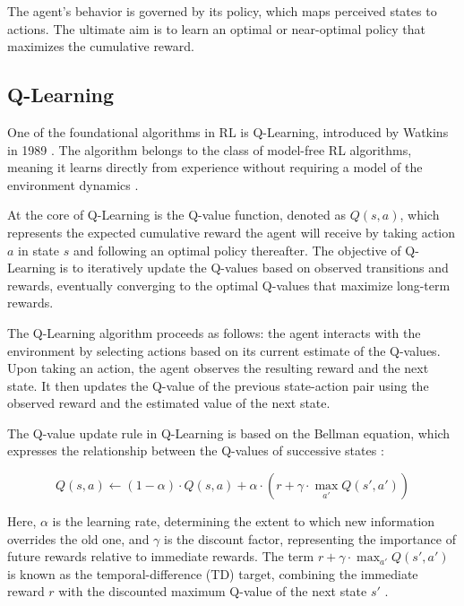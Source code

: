 The agent's behavior is governed by its policy, which maps perceived states to actions. The ultimate aim is to learn an optimal or near-optimal policy that maximizes the cumulative reward. 


\subsection{Q-Learning}

One of the foundational algorithms in RL is Q-Learning, introduced by Watkins in 1989 \cite{watkins1989learning}. The algorithm belongs to the class of model-free RL algorithms, meaning it learns directly from experience without requiring a model of the environment dynamics \cite{russel2020ai}.

At the core of Q-Learning is the Q-value function, denoted as $Q(s, a)$, which represents the expected cumulative reward the agent will receive by taking action $a$ in state $s$ and following an optimal policy thereafter. The objective of Q-Learning is to iteratively update the Q-values based on observed transitions and rewards, eventually converging to the optimal Q-values that maximize long-term rewards.

The Q-Learning algorithm proceeds as follows: the agent interacts with the environment by selecting actions based on its current estimate of the Q-values. Upon taking an action, the agent observes the resulting reward and the next state. It then updates the Q-value of the previous state-action pair using the observed reward and the estimated value of the next state.

The Q-value update rule in Q-Learning is based on the Bellman equation, which expresses the relationship between the Q-values of successive states \cite{russel2020ai}:

\[
Q(s, a) \leftarrow (1 - \alpha) \cdot Q(s, a) + \alpha \cdot \left( r + \gamma \cdot \max_{a'} Q(s', a') \right)
\]

Here, $\alpha$ is the learning rate, determining the extent to which new information overrides the old one, and $\gamma$ is the discount factor, representing the importance of future rewards relative to immediate rewards. The term $r + \gamma \cdot \max_{a'} Q(s', a')$ is known as the temporal-difference (TD) target, combining the immediate reward $r$ with the discounted maximum Q-value of the next state $s'$ \cite{russel2020ai}.


